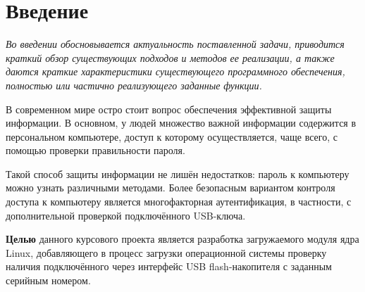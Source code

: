 \chapter*{Введение}

\textit{Во введении обосновывается актуальность поставленной задачи, приводится краткий обзор существующих подходов и методов ее реализации, а также даются краткие характеристики
существующего программного обеспечения, полностью или частично реализующего заданные функции.}

В современном мире остро стоит вопрос обеспечения эффективной защиты информации.
В основном, у людей множество важной информации содержится в персональном компьютере, доступ к которому осуществляется, чаще всего, с помощью проверки правильности пароля.

Такой способ защиты информации не лишён недостатков: пароль к компьютеру можно узнать различными методами.
Более безопасным вариантом контроля доступа к компьютеру является многофакторная аутентификация, в частности, с дополнительной проверкой подключённого USB-ключа.

\textbf{Целью} данного курсового проекта является разработка загружаемого модуля ядра Linux, добавляющего в процесс загрузки операционной системы проверку наличия подключённого через интерфейс USB flash-накопителя с заданным серийным номером.
